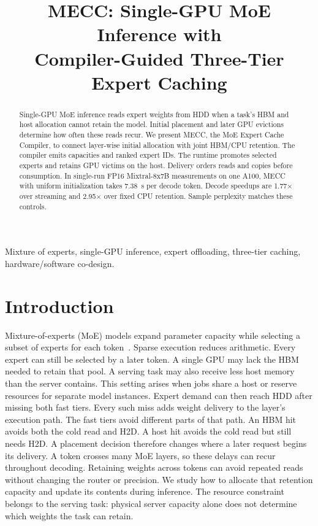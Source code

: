 \documentclass[conference,9pt,letterpaper]{IEEEtran}
\title{MECC: Single-GPU MoE Inference with\protect\\Compiler-Guided Three-Tier Expert Caching}
\author{}
\begin{document}
\maketitle\raggedbottom
\begin{abstract}
Single-GPU MoE inference reads expert weights from HDD when a task's HBM and host allocation cannot retain the model. Initial placement and later GPU evictions determine how often these reads recur. We present MECC, the MoE Expert Cache Compiler, to connect layer-wise initial allocation with joint HBM/CPU retention. The compiler emits capacities and ranked expert IDs. The runtime promotes selected experts and retains GPU victims on the host. Delivery orders reads and copies before consumption. In single-run FP16 Mixtral-8x7B measurements on one A100, MECC with uniform initialization takes 7.38~s per decode token. Decode speedups are 1.77$\times$ over streaming and 2.95$\times$ over fixed CPU retention. Sample perplexity matches these controls.
\end{abstract}

\begin{IEEEkeywords}
Mixture of experts, single-GPU inference, expert offloading, three-tier caching, hardware/software co-design.
\end{IEEEkeywords}

\section{Introduction}
Mixture-of-experts (MoE) models expand parameter capacity while selecting a subset of experts for each token~\cite{shazeer,switch,mixtral,deepseekmoe}. Sparse execution reduces arithmetic. Every expert can still be selected by a later token. A single GPU may lack the HBM needed to retain that pool. A serving task may also receive less host memory than the server contains. This setting arises when jobs share a host or reserve resources for separate model instances. Expert demand can then reach HDD after missing both fast tiers. Every such miss adds weight delivery to the layer's execution path. The fast tiers avoid different parts of that path. An HBM hit avoids both the cold read and H2D. A host hit avoids the cold read but still needs H2D. A placement decision therefore changes where a later request begins its delivery. A token crosses many MoE layers, so these delays can recur throughout decoding. Retaining weights across tokens can avoid repeated reads without changing the router or precision. We study how to allocate that retention capacity and update its contents during inference. The resource constraint belongs to the serving task: physical server capacity alone does not determine which weights the task can retain.
\end{document}
